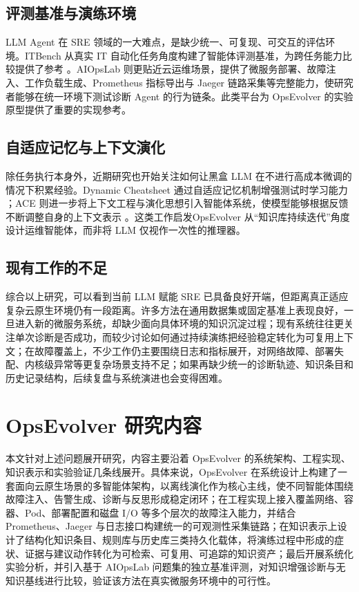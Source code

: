 \subsection{评测基准与演练环境}

LLM Agent 在 SRE 领域的一大难点，是缺少统一、可复现、可交互的评估环境。ITBench 从真实 IT 自动化任务角度构建了智能体评测基准，为跨任务能力比较提供了参考 \cite{jha2025itbench}。AIOpsLab \cite{chen2025aiopslab} 则更贴近云运维场景，提供了微服务部署、故障注入、工作负载生成、Prometheus 指标导出与 Jaeger 链路采集等完整能力，使研究者能够在统一环境下测试诊断 Agent 的行为链条。此类平台为 OpsEvolver 的实验原型提供了重要的实现参考。

\subsection{自适应记忆与上下文演化}

除任务执行本身外，近期研究也开始关注如何让黑盒 LLM 在不进行高成本微调的情况下积累经验。Dynamic Cheatsheet 通过自适应记忆机制增强测试时学习能力 \cite{suzgun2025dynamic}；ACE 则进一步将上下文工程与演化思想引入智能体系统，使模型能够根据反馈不断调整自身的上下文表示 \cite{zhang2025ace}。这类工作启发OpsEvolver 从“知识库持续迭代”角度设计运维智能体，而非将 LLM 仅视作一次性的推理器。

\subsection{现有工作的不足}

综合以上研究，可以看到当前 LLM 赋能 SRE 已具备良好开端，但距离真正适应复杂云原生环境仍有一段距离。许多方法在通用数据集或固定基准上表现良好，一旦进入新的微服务系统，却缺少面向具体环境的知识沉淀过程；现有系统往往更关注单次诊断是否成功，而较少讨论如何通过持续演练把经验稳定转化为可复用上下文；在故障覆盖上，不少工作仍主要围绕日志和指标展开，对网络故障、部署失配、内核级异常等更复杂场景支持不足；如果再缺少统一的诊断轨迹、知识条目和历史记录结构，后续复盘与系统演进也会变得困难。

\section{OpsEvolver 研究内容}
\label{sec:research_content}

本文针对上述问题展开研究，内容主要沿着 OpsEvolver 的系统架构、工程实现、知识表示和实验验证几条线展开。具体来说，OpsEvolver 在系统设计上构建了一套面向云原生场景的多智能体架构，以离线演化作为核心主线，使不同智能体围绕故障注入、告警生成、诊断与反思形成稳定闭环；在工程实现上接入覆盖网络、容器、Pod、部署配置和磁盘 I/O 等多个层次的故障注入能力，并结合 Prometheus、Jaeger 与日志接口构建统一的可观测性采集链路；在知识表示上设计了结构化知识条目、规则库与历史库三类持久化载体，将演练过程中形成的症状、证据与建议动作转化为可检索、可复用、可追踪的知识资产；最后开展系统化实验分析，并引入基于 AIOpsLab 问题集的独立基准评测，对知识增强诊断与无知识基线进行比较，验证该方法在真实微服务环境中的可行性。

